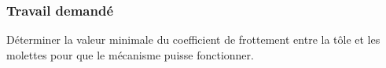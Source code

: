 \subsubsection{Travail demandé}
Déterminer la valeur minimale du coefficient de frottement entre la tôle et les molettes pour que le mécanisme puisse fonctionner.


\newpage


%
%
%
%
